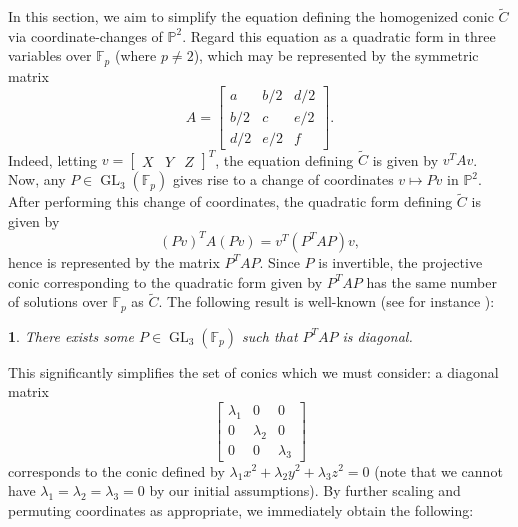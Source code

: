 \documentclass[10pt,a4paper]{amsart}
\numberwithin{equation}{section}
\numberwithin{figure}{section}
\theoremstyle{definition}
\theoremstyle{remark}
\theoremstyle{plain}
\newtheorem{thm}{\protect\theoremname}[section]
\theoremstyle{plain}
\theoremstyle{definition}
\theoremstyle{plain}
\theoremstyle{plain}
\providecommand{\theoremname}{Theorem}
\renewcommand{\P}{\mathbb{P}}
\newcommand{\F}{\mathbb{F}}
\newcommand{\GL}{\operatorname{GL}}
\begin{document}
    In this section, we aim to simplify the equation defining the homogenized conic $\widetilde{C}$ via coordinate-changes of $\P^2$. Regard this equation as a quadratic form in three variables over $\F_p$ (where $p\ne 2$), which may be represented by the symmetric matrix
\begin{equation*}
A=\begin{bmatrix}
a&b/2&d/2\\
b/2&c&e/2\\
d/2&e/2&f
\end{bmatrix}.
\end{equation*}
Indeed, letting $v=[\begin{matrix}X&Y&Z\end{matrix}]^T$, the equation defining $\widetilde{C}$ is given by $v^TAv$. Now, any $P\in\GL_3(\F_p)$ gives rise to a change of coordinates $v\mapsto Pv$ in $\P^2$. After performing this change of coordinates, the quadratic form defining $\widetilde{C}$ is given by
\begin{equation*}
(Pv)^TA(Pv)=v^T(P^TAP)v,
\end{equation*}
hence is represented by the matrix $P^TAP$. Since $P$ is invertible, the projective conic corresponding to the quadratic form given by $P^TAP$ has the same number of solutions over $\F_p$ as $\widetilde{C}$. The following result is well-known (see for instance \cite[Prop.~42:1]{omeara}):
\begin{thm}
\label{thm:diag}
There exists some $P\in\GL_3(\F_p)$ such that $P^TAP$ is diagonal.
\end{thm}
This significantly simplifies the set of conics which we must consider: a diagonal matrix
\begin{equation*}
\begin{bmatrix}
\lambda_1&0&0\\
0&\lambda_2&0\\
0&0&\lambda_3
\end{bmatrix}
\end{equation*}
corresponds to the conic defined by $\lambda_1x^2+\lambda_2y^2+\lambda_3z^2=0$ (note that we cannot have $\lambda_1=\lambda_2=\lambda_3=0$ by our initial assumptions). By further scaling and permuting coordinates as appropriate, we immediately obtain the following:
\end{document}
